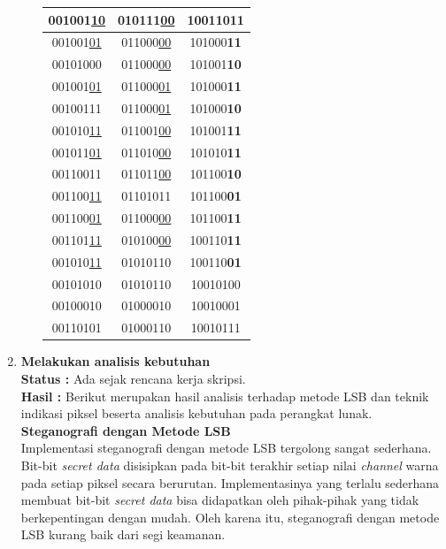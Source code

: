 \documentclass[a4paper,twoside]{article}
\begin{document}
\begin{enumerate}
\begin{itemize}
\begin{table}[!htbp]
\begin{tabular}{| c | c | c |}
		\hline
		001001\underline{10} & 010111\underline{00} & 100110\textbf{11}\\
		\hline
		001001\underline{01} & 011000\underline{00} & 101000\textbf{11}\\
		\hline
		00101000 & 011000\underline{00} & 101001\textbf{10}\\
		\hline
		001001\underline{01} & 011000\underline{01} & 101000\textbf{11}\\
		\hline
		00100111 & 011000\underline{01} & 101000\textbf{10}\\
		\hline
		001010\underline{11} & 011001\underline{00} & 101001\textbf{11}\\
		\hline
		001011\underline{01} & 011010\underline{00}& 101010\textbf{11}\\
		\hline
		00110011 & 011011\underline{00} & 101100\textbf{10}\\
		\hline
		001100\underline{11} & 01101011 & 101100\textbf{01}\\
		\hline
		001100\underline{01} & 011000\underline{00} & 101100\textbf{11}\\
		\hline
		001101\underline{11} & 010100\underline{00} & 100110\textbf{11}\\
		\hline
		001010\underline{11} & 01010110 & 100110\textbf{01}\\
		\hline
		00101010 & 01010110 & 10010100\\
		\hline
		00100010 & 01000010 & 10010001\\
		\hline
		00110101 & 01000110 & 10010111\\
		\hline
		\end{tabular}		
		\end{table}		
		
		\end{itemize}		
		
		\item \textbf{Melakukan analisis kebutuhan}\\
		{\bf Status :} Ada sejak rencana kerja skripsi.\\
		{\bf Hasil :} Berikut merupakan hasil analisis terhadap metode LSB dan teknik indikasi piksel beserta analisis kebutuhan pada perangkat lunak.\\
		
		\textbf{Steganografi dengan Metode LSB}\\
		Implementasi steganografi dengan metode LSB tergolong sangat sederhana. Bit-bit \textit{secret data} disisipkan pada bit-bit terakhir setiap nilai \textit{channel} warna pada setiap piksel secara berurutan. Implementasinya yang terlalu sederhana membuat bit-bit \textit{secret data} bisa didapatkan oleh pihak-pihak yang tidak berkepentingan dengan mudah. Oleh karena itu, steganografi dengan metode LSB kurang baik dari segi keamanan.\\
		

\end{enumerate}
\end{document}
